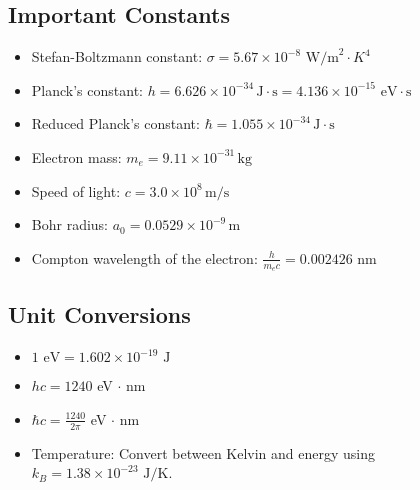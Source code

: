 \documentclass{article}
\newcommand{\tipbox}[1]{\begin{tcolorbox}[colback=green!10] #1 \end{tcolorbox}}
\newcommand{\planckconst}{6.626\times 10^{-34}\,\text{J}\cdot\text{s}}
\newcommand{\redplanck}{1.055\times 10^{-34}\,\text{J}\cdot\text{s}}
\newcommand{\electronmass}{9.11\times 10^{-31}\,\text{kg}}
\newcommand{\lightspeed}{3.0\times 10^{8}\,\text{m}/\text{s}}
\newcommand{\bohrradius}{0.0529\times 10^{-9}\,\text{m}}
\newcommand{\stefan}{5.67\times10^{-8}\text{ W/m}^2\cdot K^4}
\newcommand{\compton}{0.002426\text{ nm}}
\begin{document}
\subsection{Important Constants}
\tipbox{
\begin{itemize}
    \item Stefan-Boltzmann constant: $\sigma = \stefan$
    \item Planck's constant: $h = \planckconst = 4.136\times10^{-15}\text{ eV}\cdot\text{s}$
    \item Reduced Planck's constant: $\hbar = \redplanck$
    \item Electron mass: $m_e = \electronmass$
    \item Speed of light: $c = \lightspeed$
    \item Bohr radius: $a_0 = \bohrradius$
    \item Compton wavelength of the electron: $\displaystyle\frac{h}{m_ec} = \compton$
\end{itemize}
}

\subsection{Unit Conversions}
\tipbox{
\begin{itemize}
    \item $1 \text{ eV} = 1.602 \times 10^{-19} \text{ J}$
    \item $hc = 1240$ eV $\cdot$ nm
    \item $\hbar c = \displaystyle\frac{1240}{2\pi}$ eV $\cdot$ nm
    \item Temperature: Convert between Kelvin and energy using $k_B = 1.38 \times 10^{-23} \text{ J/K}$.
\end{itemize}
}
\end{document}

